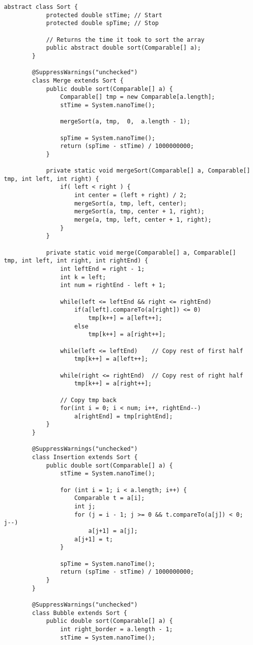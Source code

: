 	\vspace{2cm}
	\begin{lstlisting}[caption=Sort.java]
		abstract class Sort {
			protected double stTime; // Start
			protected double spTime; // Stop
			
			// Returns the time it took to sort the array
			public abstract double sort(Comparable[] a);
		}
		
		@SuppressWarnings("unchecked")
		class Merge extends Sort {
			public double sort(Comparable[] a) {
				Comparable[] tmp = new Comparable[a.length];
				stTime = System.nanoTime();
				
				mergeSort(a, tmp,  0,  a.length - 1);
				
				spTime = System.nanoTime();
				return (spTime - stTime) / 1000000000;
			}
			
			private static void mergeSort(Comparable[] a, Comparable[] tmp, int left, int right) {
				if( left < right ) {
					int center = (left + right) / 2;
					mergeSort(a, tmp, left, center);
					mergeSort(a, tmp, center + 1, right);
					merge(a, tmp, left, center + 1, right);
				}
			}
			
			private static void merge(Comparable[] a, Comparable[] tmp, int left, int right, int rightEnd) {
				int leftEnd = right - 1;
				int k = left;
				int num = rightEnd - left + 1;
				
				while(left <= leftEnd && right <= rightEnd)
					if(a[left].compareTo(a[right]) <= 0)
						tmp[k++] = a[left++];
					else
						tmp[k++] = a[right++];
				
				while(left <= leftEnd)    // Copy rest of first half
					tmp[k++] = a[left++];
				
				while(right <= rightEnd)  // Copy rest of right half
					tmp[k++] = a[right++];
				
				// Copy tmp back
				for(int i = 0; i < num; i++, rightEnd--)
					a[rightEnd] = tmp[rightEnd];
			}
		}
		
		@SuppressWarnings("unchecked")
		class Insertion extends Sort {
			public double sort(Comparable[] a) {
				stTime = System.nanoTime();
				
				for (int i = 1; i < a.length; i++) {
					Comparable t = a[i];
					int j;
					for (j = i - 1; j >= 0 && t.compareTo(a[j]) < 0; j--)
						a[j+1] = a[j];
					a[j+1] = t;
				}
				
				spTime = System.nanoTime();
				return (spTime - stTime) / 1000000000;
			}
		}
		
		@SuppressWarnings("unchecked")
		class Bubble extends Sort {
			public double sort(Comparable[] a) {
				int right_border = a.length - 1;
				stTime = System.nanoTime();
				

\end{lstlisting}
